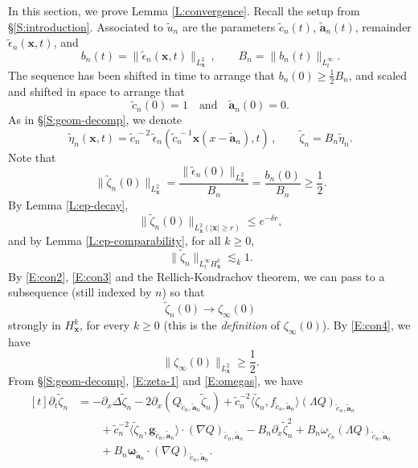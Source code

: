 \documentclass[12pt,letterpaper]{amsart}
\newcommand{\la}{\langle}
\newcommand{\ra}{\rangle}
\theoremstyle{remark}
\numberwithin{equation}{section}
\numberwithin{theorem}{section}
\numberwithin{table}{section}
\begin{document}
In this section, we prove Lemma \ref{L:convergence}.  Recall the setup from \S\ref{S:introduction}.  
Associated to $\tilde u_n$ are the parameters $\tilde c_n(t)$, $\tilde{\mathbf{a}}_n(t)$,  remainder $\tilde{\epsilon}_n(\mathbf{x},t)$,  and 
$$
b_n(t) = \|\tilde{\epsilon}_n(\mathbf{x},t) \|_{L_{\mathbf{x}}^2} \,, \qquad B_n = \|b_n(t) \|_{L_t^\infty}.
$$
The sequence has been shifted in time to arrange that $b_n(0) \geq \frac12 B_n$, and scaled and shifted in space to arrange that
$$\tilde c_n(0)=1 \quad \mbox{and} \quad \tilde{\mathbf{a}}_n(0) = 0.$$
As in \S\ref{S:geom-decomp}, we denote
\begin{equation}
\label{E:tilzeta}
\tilde{\eta}_n(\mathbf{x},t) = \tilde c_n^{\,-2} \,\tilde\epsilon_n ( \tilde c_n^{\,-1}\mathbf{x}(x-\tilde{\mathbf{a}}_n),t) \,, \qquad \tilde{\zeta}_n= B_n \tilde{\eta}_n.
\end{equation}
Note that
\begin{equation}
\label{E:con4}
\| \tilde \zeta_n(0) \|_{L_{\mathbf{x}}^2} = \frac{\| \tilde \epsilon_n(0) \|_{L_{\mathbf{x}}^2}}{B_n} = \frac{b_n(0)}{B_n} \geq \frac12.
\end{equation}
By Lemma \ref{L:ep-decay},
\begin{equation}
\label{E:con2}
\| \tilde \zeta_n(0) \|_{L_{\mathbf{x}}^2(|\mathbf{x}|\geq r)} \leq e^{-\delta r},
\end{equation}
and by Lemma \ref{L:ep-comparability}, for all $k \geq 0$,
\begin{equation}
\label{E:con3}
\| \tilde \zeta_n \|_{L_t^\infty H_{\mathbf{x}}^k} \lesssim_k 1.
\end{equation}
By \eqref{E:con2}, \eqref{E:con3} and the Rellich-Kondrachov theorem, we can pass to a subsequence (still indexed by $n$) so that
$$\tilde{\zeta}_n(0) \to \zeta_\infty(0)$$
strongly in $H_{\mathbf{x}}^k$, for every $k\geq 0$ (this is the \emph{definition} of $\zeta_\infty(0)$).  By \eqref{E:con4}, we have
$$\|\zeta_\infty(0)\|_{L_{\mathbf{x}}^2} \geq \frac12.$$
From \S \ref{S:geom-decomp}, \eqref{E:zeta-1} and \eqref{E:omegas}, we have
\begin{equation}
\label{E:con6}
\begin{aligned}[t]
\partial_t \tilde{\zeta}_n &= - \partial_x \Delta \tilde{\zeta}_n - 2 \partial_x ( Q_{\tilde c_n,\tilde{\mathbf{a}}_n} \tilde{\zeta}_n) + \tilde c_n^{-2} \la \tilde{\zeta}_n, f_{\tilde c_n,\tilde{\mathbf{a}}_n}\ra (\Lambda Q)_{\tilde c_n,\tilde{\mathbf{a}}_n} \\
& \qquad + \tilde c_n^{-2}\la \tilde{\zeta}_n, \mathbf{g}_{\tilde c_n,\tilde{\mathbf{a}}_n} \ra \cdot (\nabla Q)_{\tilde c_n,\tilde{\mathbf{a}}_n} - B_n \partial_x \tilde{\zeta}_n^2 + B_n \omega_{\tilde c_n} (\Lambda Q)_{\tilde c_n,\tilde{\mathbf{a}}_n} \\
& \qquad + B_n\boldsymbol{\omega}_{\tilde{\mathbf{a}}_n} \cdot (\nabla Q)_{{\tilde c_n},\tilde{\mathbf{a}}_n}.
\end{aligned}
\end{equation}
\end{document}
